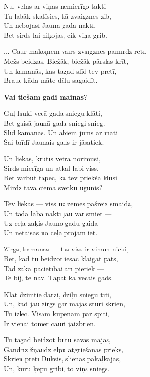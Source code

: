 \documentclass[14pt]{extarticle}
\begin{document}
{{Nu, velns ar viņas nemierīgo takti ---\\
Tu labāk skatīsies, kā zvaigznes zib,\\
Un nebojāsi Jaunā gada nakti,\\
Bet sirds lai niķojas, cik viņa grib.

... Caur mākoņiem vairs zvaigznes pamirdz reti.\\
Mežs beidzas. Biežāk, biežāk pārslas krīt,\\
Un kamanās, kas tagad slīd tev pretī,\\
Brauc kāda māte dēlu sagaidīt. 

\newpage

{\bf Vai tiešām gadi mainās?}

Guļ lauki vecā gada sniegu klāti,\\
Bet gaisā jaunā gada sniegi snieg.\\
Slīd kamanas. Un abiem jums ar māti\\
Šai brīdī Jaunais gads ir jāsatiek.

Un liekas, krūtīs vētra norimusi,\\
Sirds mierīga un atkal labi viss,\\
Bet varbūt tāpēc, ka tev priekšā klusi\\
Mirdz tava ciema svētku ugunis?

Tev liekas --- viss uz zemes pašreiz smaida,\\
Un tādā labā naktī jau var smiet ---\\
Uz ceļa zaķis Jauno gadu gaida\\
Un netaisās no ceļa projām iet. 

Zirgs, kamanas --- tas viss ir viņam nieki,\\
Bet, kad tu beidzot iesāc klaigāt pats,\\
Tad zaķa pacietībai arī pietiek ---\\
Te bij, te nav. Tāpat kā vecais gads. 

Klāt dzimtie dārzi, dziļu sniegu tīti,\\
Un, kad jau zirgs gar mājas stūri skrien,\\
Tu izlec. Visām kupenām par spīti,\\
Ir vienai tomēr cauri jāizbrien. 

Tu tagad beidzot būtu savās mājās,\\
Gandrīz žņaudz elpu atgriešanās prieks,\\
Skrien pretī Duksis, slienas pakaļkājās,\\
Un, kuru ķepu gribi, to viņs sniegs. 

}}
\end{document}
